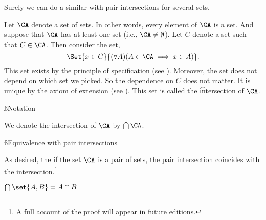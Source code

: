 

Surely we can do a similar with pair intersections for several sets.


Let $\CA$ denote a set of sets.
In other words, every element of $\CA$ is a set.
And suppose that $\CA$ has at least one set (i.e., $\CA \neq \emptyset$).
Let $C$ denote a set such that $C \in \CA$.
Then consider the set,
\[
	\Set{x \in C}{(\forall A)(A \in \CA \implies x \in A)}.
\]
This set exists by the principle of specification (see ).
Moreover, the set does not depend on which set we picked.
So the dependence on $C$ does not matter.
It is unique by the axiom of extension (see ).
This set is called the \t{intersection} of $\CA$.

\ss{Notation}

We denote the intersection of $\CA$ by $\bigcap \CA$.

\ss{Equivalence with pair intersections}

As desired, the if the set $\CA$ is a pair of sets, the pair intersection coincides with the intersection.\footnote{A full account of the proof will appear in future editions.}

\begin{proposition}
  $\bigcap \set{A, B} = A \cap B$
\end{proposition}

%
